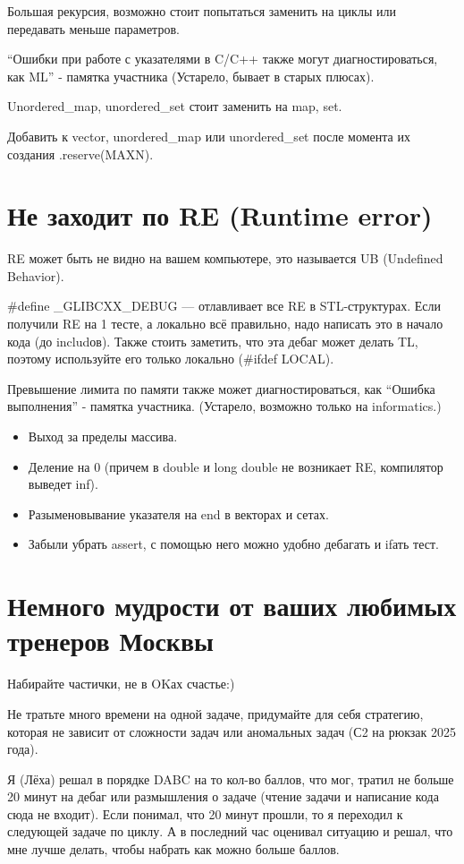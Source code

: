 \documentclass[12pt,a4paper]{article}
\begin{document}
Большая рекурсия, возможно стоит попытаться заменить на циклы или передавать меньше параметров.

``Ошибки при работе с указателями в C/C++ также могут диагностироваться, как ML'' - памятка участника (Устарело, бывает в старых плюсах).

Unordered\_map, unordered\_set стоит заменить на map, set.

Добавить к vector, unordered\_map или unordered\_set после момента их создания .reserve(MAXN).

\section*{Не заходит по RE (Runtime error)}

RE может быть не видно на вашем компьютере, это называется UB (Undefined Behavior).

\#define \_GLIBCXX\_DEBUG — отлавливает все RE в STL-структурах. Если получили RE на 1 тесте, а локально всё правильно, надо написать это в начало кода (до includов). Также стоить заметить, что эта дебаг может делать TL, поэтому используйте его только локально (\#ifdef LOCAL).

Превышение лимита по памяти также может диагностироваться, как ``Ошибка выполнения'' - памятка участника. (Устарело, возможно только на informatics.)

\begin{itemize}
\item Выход за пределы массива.
\item Деление на 0 (причем в double и long double не возникает RE,   компилятор выведет inf).
\item Разыменовывание указателя на end в векторах и сетах.
\item Забыли убрать assert, с помощью него можно удобно дебагать и ifать тест.
\end{itemize}

\section*{Немного мудрости от ваших любимых тренеров Москвы}

Набирайте частички, не в OKах счастье:)

Не тратьте много времени на одной задаче, придумайте для себя стратегию, которая не зависит от сложности задач или аномальных задач (С2 на рюкзак 2025 года).

Я (Лёха) решал в порядке DABC на то кол-во баллов, что мог, тратил не больше 20 минут на дебаг или размышления о задаче (чтение задачи и написание кода сюда не входит). Если понимал, что 20 минут прошли, то я переходил к следующей задаче по циклу. А в последний час оценивал ситуацию и решал, что мне лучше делать, чтобы набрать как можно больше баллов.
\end{document}
